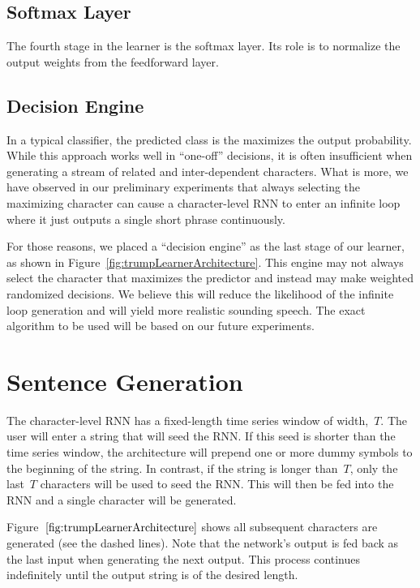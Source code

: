 \documentclass{report}
\begin{document}
  \subsection{Softmax Layer}
  
  The fourth stage in the learner is the softmax layer. Its role is to normalize the output weights from the feedforward layer.  
  
  \subsection{Decision Engine}
  
  In a typical classifier, the predicted class is the maximizes the output probability.  While this approach works well in ``one-off'' decisions, it is often insufficient when generating a stream of related and inter-dependent characters.  What is more, we have observed in our preliminary experiments that always selecting the maximizing character can cause a character-level RNN to enter an infinite loop where it just outputs a single short phrase continuously.
  
  For those reasons, we placed a ``decision engine'' as the last stage of our learner, as shown in Figure~\ref{fig:trumpLearnerArchitecture}.  This engine may not always select the character that maximizes the predictor and instead may make weighted randomized decisions.  We believe this will reduce the likelihood of the infinite loop generation and will yield more realistic sounding speech.  The exact algorithm to be used will be based on our future experiments.
  
  \section{Sentence Generation}
  
  The character-level RNN has a fixed-length time series window of width,~$T$.  The user will enter a string that will seed the RNN.  If this seed is shorter than the time series window, the architecture will prepend one or more dummy symbols to the beginning of the string.  In contrast, if the string is longer than~$T$, only the last~$T$ characters will be used to seed the RNN.  This will then be fed into the RNN and a single character will be generated.
  
  Figure~$\ref{fig:trumpLearnerArchitecture}$ shows all subsequent characters are generated (see the dashed lines).  Note that the network's output is fed back as the last input when generating the next output.  This process continues indefinitely until the output string is of the desired length.
  
\end{document}
